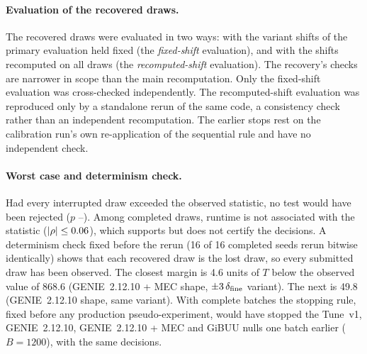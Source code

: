 \paragraph{Evaluation of the recovered draws.} The recovered draws were evaluated in two ways: with the variant shifts of the primary evaluation held fixed (the \emph{fixed-shift} evaluation), and with the shifts recomputed on all draws (the \emph{recomputed-shift} evaluation). The recovery's checks are narrower in scope than the main recomputation. Only the fixed-shift evaluation was cross-checked independently. The recomputed-shift evaluation was reproduced only by a standalone rerun of the same code, a consistency check rather than an independent recomputation. The earlier stops rest on the calibration run's own re-application of the sequential rule and have no independent check.

\paragraph{Worst case and determinism check.} Had every interrupted draw exceeded the observed statistic, no test would have been rejected ($p$ \jtWorstIntLo--\jtWorstIntHi). Among completed draws, runtime is not associated with the statistic ($|\rho|\le0.06$), which supports but does not certify the decisions. A determinism check fixed before the rerun (16 of 16 completed seeds rerun bitwise identically) shows that each recovered draw is the lost draw, so every submitted draw has been observed. The closest margin is 4.6 units of $T$ below the observed value of 868.6 (GENIE~2.12.10 + MEC shape, $\pm3\,\delta_{\mathrm{fine}}$ variant). The next is 49.8 (GENIE~2.12.10 shape, same variant). With complete batches the stopping rule, fixed before any production pseudo-experiment, would have stopped the Tune~v1, GENIE~2.12.10, GENIE~2.12.10 + MEC and GiBUU nulls one batch earlier ($B=1200$), with the same decisions.


